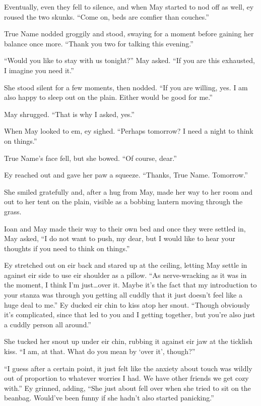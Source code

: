 Eventually, even they fell to silence, and when May started to nod off as well, ey roused the two skunks. ``Come on, beds are comfier than couches.''

True Name nodded groggily and stood, swaying for a moment before gaining her balance once more. ``Thank you two for talking this evening.''

``Would you like to stay with us tonight?'' May asked. ``If you are this exhausted, I imagine you need it.''

She stood silent for a few moments, then nodded. ``If you are willing, yes. I am also happy to sleep out on the plain. Either would be good for me.''

May shrugged. ``That is why I asked, yes.''

When May looked to em, ey sighed. ``Perhaps tomorrow? I need a night to think on things.''

True Name's face fell, but she bowed. ``Of course, dear.''

Ey reached out and gave her paw a squeeze. ``Thanks, True Name. Tomorrow.''

She smiled gratefully and, after a hug from May, made her way to her room and out to her tent on the plain, visible as a bobbing lantern moving through the grass.

Ioan and May made their way to their own bed and once they were settled in, May asked, ``I do not want to push, my dear, but I would like to hear your thoughts if you need to think on things.''

Ey stretched out on eir back and stared up at the ceiling, letting May settle in against eir side to use eir shoulder as a pillow. ``As nerve-wracking as it was in the moment, I think I'm just\ldots over it. Maybe it's the fact that my introduction to your stanza was through you getting all cuddly that it just doesn't feel like a huge deal to me.'' Ey ducked eir chin to kiss atop her snout. ``Though obviously it's complicated, since that led to you and I getting together, but you're also just a cuddly person all around.''

She tucked her snout up under eir chin, rubbing it against eir jaw at the ticklish kiss. ``I am, at that. What do you mean by `over it', though?''

``I guess after a certain point, it just felt like the anxiety about touch was wildly out of proportion to whatever worries I had. We have other friends we get cozy with.'' Ey grinned, adding, ``She just about fell over when she tried to sit on the beanbag. Would've been funny if she hadn't also started panicking.''

